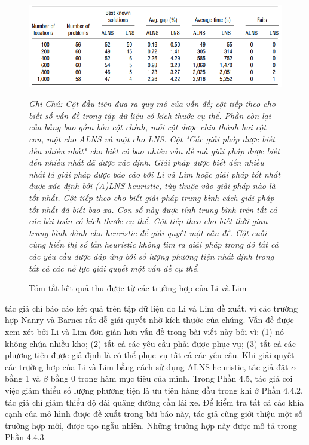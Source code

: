 \begin{center}
    \begin{figure}[htp]
    \caption{Tóm tắt kết quả thu được từ các trường hợp của Li và Lim}        
    \begin{center}
     \includegraphics[scale=.5]{figures/Thuy_table5}
    \end{center}
  \textit{Ghi Chú: Cột đầu tiên đưa ra quy mô của vấn đề; cột tiếp theo cho biết số vấn đề trong tập dữ liệu có kích thước cụ thể. Phần còn lại của bảng bao gồm bốn cột chính, mỗi cột được chia thành hai cột con, một cho ALNS và một cho LNS. Cột "Các giải pháp được biết đến nhiều nhất" cho biết có bao nhiêu vấn đề mà giải pháp được biết đến nhiều nhất đã được xác định. Giải pháp được biết đến nhiều nhất là giải pháp được báo cáo bởi Li và Lim hoặc giải pháp tốt nhất được xác định bởi (A)LNS heuristic, tùy thuộc vào giải pháp nào là tốt nhất. Cột tiếp theo cho biết giải pháp trung bình cách giải pháp tốt nhất đã biết bao xa. Con số này được tính trung bình trên tất cả các bài toán có kích thước cụ thể. Cột tiếp theo cho biết thời gian trung bình dành cho heuristic để giải quyết một vấn đề. Cột cuối cùng hiển thị số lần heuristic không tìm ra giải pháp trong đó tất cả các yêu cầu được đáp ứng bởi số lượng phương tiện nhất định trong tất cả các nỗ lực giải quyết một vấn đề cụ thể.}
    \end{figure}
\end{center}

tác giả chỉ báo cáo kết quả trên tập dữ liệu do Li và Lim đề xuất, vì các trường hợp Nanry và Barnes rất dễ giải quyết nhờ kích thước của chúng.
Vấn đề được xem xét bởi Li và Lim đơn giản hơn vấn đề trong bài viết này bởi vì: (1) nó không chứa nhiều kho; (2) tất cả các yêu cầu phải được phục vụ; (3) tất cả các phương tiện được giả định là có thể phục vụ tất cả các yêu cầu. Khi giải quyết các trường hợp của Li và Lim bằng cách sử dụng ALNS heuristic, tác giả đặt $\alpha$ bằng 1 và $\beta$ bằng 0 trong hàm mục tiêu của mình. Trong Phần 4.5, tác giả coi việc giảm thiểu số lượng phương tiện là ưu tiên hàng đầu trong khi ở Phần 4.4.2, tác giả chỉ giảm thiểu độ dài quãng đường cần lái xe.
Để kiểm tra tất cả các khía cạnh của mô hình được đề xuất trong bài báo này, tác giả cũng giới thiệu một số trường hợp mới, được tạo ngẫu nhiên. Những trường hợp này được mô tả trong Phần 4.4.3.

